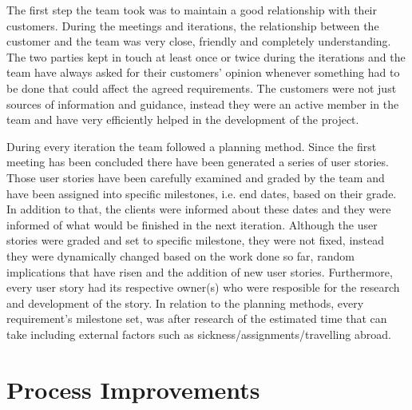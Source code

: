 \documentclass{l3proj}
\begin{document}
The first step the team took was to maintain a good relationship with their customers. During the meetings and iterations, the relationship
between the customer and the team was very close, friendly and completely understanding. The two parties kept in touch at least once or twice during the
iterations and the team have always asked for their customers' opinion whenever something had to be done that could affect the agreed requirements.
The customers were not just sources of information and guidance, instead they were an active member in the team and have very
efficiently helped in the development of the project.

During every iteration the team followed a planning method. Since the first meeting has been concluded there have been generated a series of
user stories. Those user stories have been carefully examined and graded by the team and have been assigned into specific milestones, i.e.
end dates, based on their grade. In addition to that, the clients were informed about these dates and they were informed of what would be finished in the next 
iteration. Although the user stories were graded and set to specific milestone, they were not fixed, instead they were dynamically changed based on the work done 
so far, random implications that have risen and the addition of new user stories. Furthermore, every user story had its respective owner(s) who were 
resposible for the research and development of the story. In relation to the planning methods, every requirement's milestone set, was 
after research of the estimated time that can take including external factors such as sickness/assignments/travelling abroad.


\section{Process Improvements}
\label{sec:process-improvements}

\end{document}
